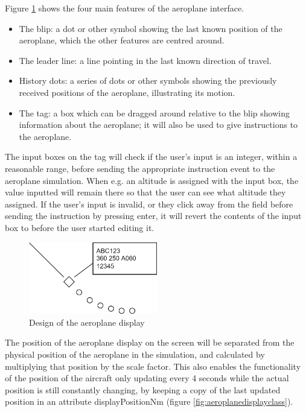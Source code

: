 \documentclass{article}
\begin{document}
Figure \ref{fig:aeroplane_design} shows the four main features of the aeroplane interface.
\begin{itemize}
    \item The blip: a dot or other symbol showing the last known position of the aeroplane, which the other features are centred around.
    \item The leader line: a line pointing in the last known direction of travel.
    \item History dots: a series of dots or other symbols showing the previously received positions of the aeroplane, illustrating its motion.
    \item The tag: a box which can be dragged around relative to the blip showing information about the aeroplane; it will also be used to give instructions to the aeroplane.
\end{itemize}

The input boxes on the tag will check if the user's input is an integer, within a reasonable range, before sending the appropriate instruction event to the aeroplane simulation.
When e.g. an altitude is assigned with the input box, the value inputted will remain there so that the user can see what altitude they assigned.
If the user's input is invalid, or they click away from the field before sending the instruction by pressing enter, it will revert the contents of the input box to before the user started editing it.

\begin{figure}[H]
\centering
\includegraphics[width=0.5\textwidth]{diagrams/aeroplane_design.png}
\caption{\label{fig:aeroplane_design}Design of the aeroplane display}
\end{figure}

The position of the aeroplane display on the screen will be separated from the physical position of the aeroplane in the simulation, and calculated by multiplying that position by the scale factor.
This also enables the functionality of the position of the aircraft only updating every 4 seconds while the actual position is still constantly changing, by keeping a copy of the last updated position in an attribute displayPositionNm (figure \ref{fig:aeroplanedisplayclass}).
\end{document}

